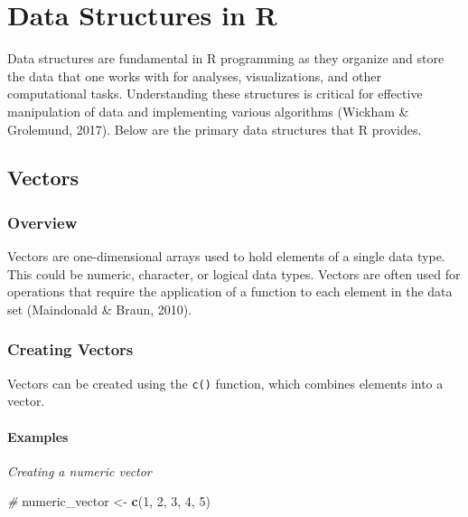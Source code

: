 \documentclass[
  b5paper]{book}
\newenvironment{Shaded}{\begin{snugshade}}{\end{snugshade}}
\newcommand{\CommentTok}[1]{\textcolor[rgb]{0.56,0.35,0.01}{\textit{#1}}}
\newcommand{\DecValTok}[1]{\textcolor[rgb]{0.00,0.00,0.81}{#1}}
\newcommand{\FunctionTok}[1]{\textcolor[rgb]{0.13,0.29,0.53}{\textbf{#1}}}
\newcommand{\NormalTok}[1]{#1}
\newcommand{\OtherTok}[1]{\textcolor[rgb]{0.56,0.35,0.01}{#1}}
\begin{document}
\hypertarget{data-structures-in-r}{%
\section{Data Structures in R}\label{data-structures-in-r}}

Data structures are fundamental in R programming as they organize and store the data that one works with for analyses, visualizations, and other computational tasks. Understanding these structures is critical for effective manipulation of data and implementing various algorithms (Wickham \& Grolemund, 2017). Below are the primary data structures that R provides.

\hypertarget{vectors}{%
\subsection*{Vectors}\label{vectors}}

\hypertarget{overview-2}{%
\subsubsection*{Overview}\label{overview-2}}

Vectors are one-dimensional arrays used to hold elements of a single data type. This could be numeric, character, or logical data types. Vectors are often used for operations that require the application of a function to each element in the data set (Maindonald \& Braun, 2010).

\hypertarget{creating-vectors}{%
\subsubsection*{Creating Vectors}\label{creating-vectors}}

Vectors can be created using the \texttt{c()} function, which combines elements into a vector.

\hypertarget{examples-2}{%
\paragraph*{Examples}\label{examples-2}}

\emph{Creating a numeric vector}

\begin{Shaded}
\begin{Highlighting}[]
\CommentTok{\# }
\NormalTok{numeric\_vector }\OtherTok{\textless{}{-}} \FunctionTok{c}\NormalTok{(}\DecValTok{1}\NormalTok{, }\DecValTok{2}\NormalTok{, }\DecValTok{3}\NormalTok{, }\DecValTok{4}\NormalTok{, }\DecValTok{5}\NormalTok{)}
\end{Highlighting}
\end{Shaded}
\end{document}

